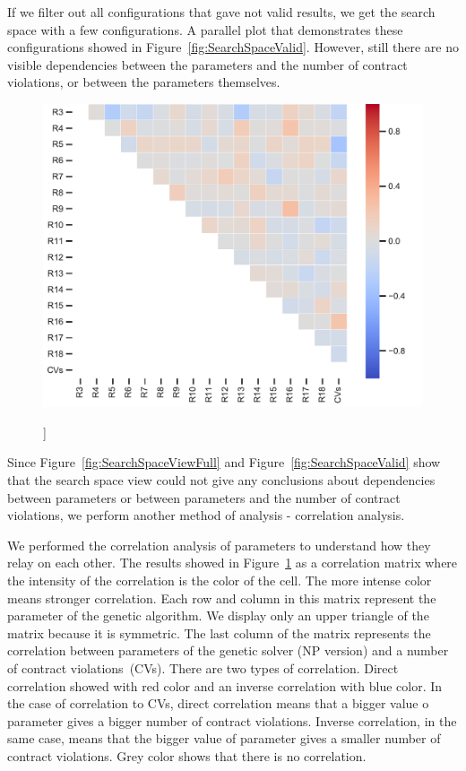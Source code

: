 If we filter out all configurations that gave not valid results, we get the search space with a few configurations. A parallel plot that demonstrates these configurations showed in Figure~\ref{fig:SearchSpaceValid}. However, still there are no visible dependencies between the parameters and the number of contract violations, or between the parameters themselves.

\begin{figure}
	\centering
	\includegraphics[width=\textwidth]{images/CorrelationAnalysis.pdf}
	\caption[]]{}
	\label{fig:CorrelationAnalysis}
\end{figure}

Since Figure~\ref{fig:SearchSpaceViewFull} and Figure~\ref{fig:SearchSpaceValid} show that the search space view could not give any conclusions about dependencies between parameters or between parameters and the number of contract violations, we perform another method of analysis - correlation analysis.

We performed the correlation analysis of parameters to understand how they relay on each other. The results showed in Figure~\ref{fig:CorrelationAnalysis} as a correlation matrix where the intensity of the correlation is the color of the cell. The more intense color means stronger correlation. Each row and column in this matrix represent the parameter of the genetic algorithm. We display only an upper triangle of the matrix because it is symmetric. The last column of the matrix represents the correlation between parameters of the genetic solver (NP version) and a number of contract violations~(CVs). There are two types of correlation. Direct correlation showed with red color and an inverse correlation with blue color. In the case of correlation to CVs, direct correlation means that a bigger value o parameter gives a bigger number of contract violations. Inverse correlation, in the same case, means that the bigger value of parameter gives a smaller number of contract violations. Grey color shows that there is no correlation.

